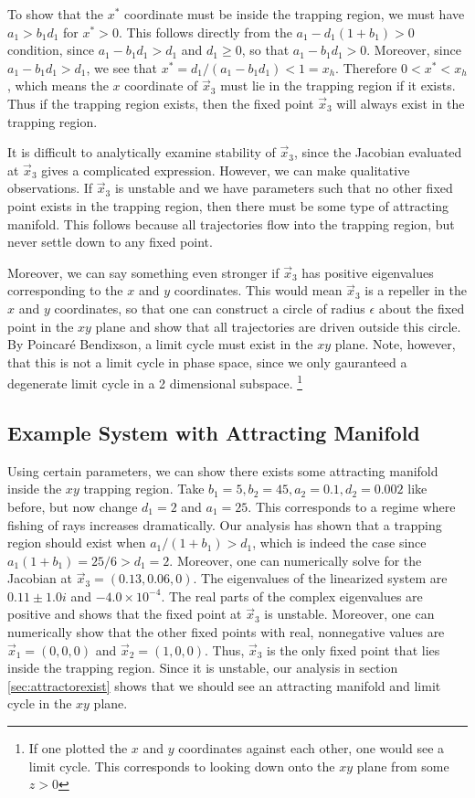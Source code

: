 \documentclass[12pt,journal,compsoc,twoside]{IEEEtran}
\begin{document}
To show that the $x^{*}$ coordinate must be inside the trapping region, we must have $a_1 > b_1 d_1$ for $x^{*} > 0$. This follows directly from the $a_1 - d_1(1 + b_1) > 0$ condition, since $a_1 - b_1 d_1 > d_1$ and $d_1 \geq 0$, so that $a_1 - b_1 d_1 > 0$. Moreover, since $a_1 - b_1 d_1 > d_1$, we see that $x^{*} = d_1 / (a_1 - b_1 d_1) < 1 = x_h$. Therefore $0 < x^{*} < x_h$, which means the $x$ coordinate of $\vec{x}_3$ must lie in the trapping region if it exists. Thus if the trapping region exists, then the fixed point $\vec{x}_3$ will always exist in the trapping region. 

It is difficult to analytically examine stability of $\vec{x}_3$, since the Jacobian evaluated at $\vec{x}_3$ gives a complicated expression. However, we can make qualitative observations. If $\vec{x}_3$ is unstable and we have parameters such that no other fixed point exists in the trapping region, then there must be some type of attracting manifold. This follows because all trajectories flow into the trapping region, but never settle down to any fixed point.

Moreover, we can say something even stronger if $\vec{x}_3$ has positive eigenvalues corresponding to the $x$ and $y$ coordinates. This would mean $\vec{x}_3$ is a repeller in the $x$ and $y$ coordinates, so that one can construct a circle of radius $\epsilon$ about the fixed point in the $xy$ plane and show that all trajectories are driven outside this circle. By Poincar\'{e} Bendixson, a limit cycle must exist in the $xy$ plane. Note, however, that this is not a limit cycle in phase space, since we only gauranteed a degenerate limit cycle in a 2 dimensional subspace. \footnote{If one plotted the $x$ and $y$ coordinates against each other, one would see a limit cycle. This corresponds to looking down onto the $xy$ plane from some $z > 0$}

\subsection{Example System with Attracting Manifold}

Using certain parameters, we can show there exists some attracting manifold inside the $xy$ trapping region. Take $b_1 = 5, b_2 = 45, a_2 = 0.1, d_2 = 0.002$ like before, but now change $d_1 = 2$ and $a_1 = 25$. This corresponds to a regime where fishing of rays increases dramatically. Our analysis has shown that a trapping region should exist when $a_1 / (1 + b_1) > d_1$, which is indeed the case since $a_1 ( 1 + b_1) = 25 / 6 > d_1 = 2$. Moreover, one can numerically solve for the Jacobian at $\vec{x}_3 = (0.13, 0.06, 0)$. The eigenvalues of the linearized system are $0.11 \pm 1.0i$ and $-4.0 \times 10^{-4}$. The real parts of the complex eigenvalues are positive and shows that the fixed point at $\vec{x}_3$ is unstable. Moreover, one can numerically show that the other fixed points with real, nonnegative values are $\vec{x}_1 = (0,0,0)$ and  $\vec{x}_2 = (1,0,0)$. Thus, $\vec{x}_3$ is the only fixed point that lies inside the trapping region. Since it is unstable, our analysis in section \ref{sec:attractorexist} shows that we should see an attracting manifold and limit cycle in the $xy$ plane.
\end{document}
